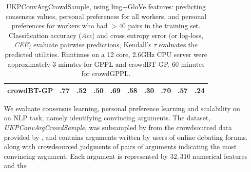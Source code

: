 \begin{table}
\begin{tabular}{ l l l l@{\hskip 1.0cm} l l l@{\hskip 1.0cm} l l l}
 crowdBT-GP & .77 & .52 & .50 & .69 & .58 & .30 & .70 & .57 & .24
 \\ \bottomrule
\end{tabular}
\caption{UKPConvArgCrowdSample,  using ling+GloVe features: predicting consensus values, personal preferences for all workers,
and personal preferences for workers who had $>$40 pairs in the training set.
Classification accuracy (\emph{Acc}) and cross entropy error (or log-loss, \emph{CEE}) evaluate
pairwise predictions, 
Kendall's $\tau$ evaluates the predicted utilities. 
Runtimes on a 12 core, 2.6GHz CPU server were approximately 3 minutes for GPPL and crowdBT-GP, 
 60 minutes for crowdGPPL.
}
\label{tab:convarg}
\end{table}
We evaluate consensus learning, personal preference learning and scalability
on an NLP task, namely identifying convincing arguments. 
The dataset, \emph{UKPConvArgCrowdSample}, was subsampled by \citet{simpson2018finding}
from the crowdsourced data provided by \citet{habernal2016argument}, and
contains arguments written by users
of online debating forums,
along with crowdsourced judgments of pairs of arguments
 indicating the most convincing argument.
Each argument is represented by $32,310$ numerical features and the

